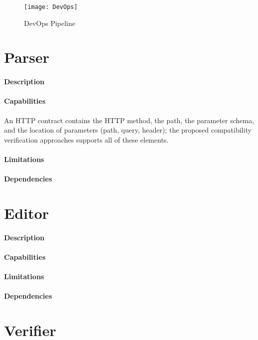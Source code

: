 \begin{figure}[htbp]
    \centering
    \texttt{[image: DevOps]}
    \caption{DevOps Pipeline}
    \label{fig:pipeline}
\end{figure}

\newpage

\section{Parser} %
\label{sec:parser}

\paragraph{Description}
\paragraph{Capabilities}
An HTTP contract contains the HTTP method, the
path, the parameter schema, and the location of parameters (path, query, header); the
proposed compatibility verification approaches supports all of these elements.
\paragraph{Limitations}
\paragraph{Dependencies}

\section{Editor} %
\label{sec:editor}

\paragraph{Description}
\paragraph{Capabilities}
\paragraph{Limitations}
\paragraph{Dependencies}

\section{Verifier} %
\label{sec:verifier}

